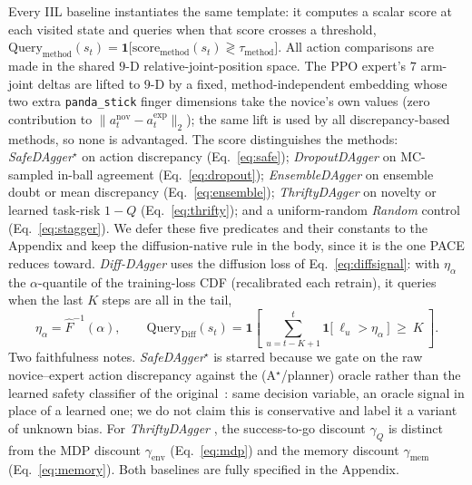 \documentclass[letterpaper]{article} %
\begin{document}
Every IIL baseline instantiates the same template: it computes a scalar score at
each visited state and queries when that score crosses a threshold,
$\mathrm{Query}_{\mathrm{method}}(s_t)=\mathbf{1}\big[\mathrm{score}_{\mathrm{method}}(s_t)\gtrless\tau_{\mathrm{method}}\big]$.
All action comparisons are made in the shared $9$-D relative-joint-position space. The
PPO expert's $7$ arm-joint deltas are lifted to $9$-D by a fixed, method-independent
embedding whose two extra \texttt{panda\_stick} finger dimensions take the novice's
own values (zero contribution to $\|a^{\mathrm{nov}}_t-a^{\mathrm{exp}}_t\|_2$); the
same lift is used by all discrepancy-based methods, so none is advantaged. The score
distinguishes the methods: \emph{SafeDAgger}$^\star$ on action discrepancy
(Eq.~\ref{eq:safe}); \emph{DropoutDAgger} on MC-sampled in-ball agreement
(Eq.~\ref{eq:dropout}); \emph{EnsembleDAgger} on ensemble doubt or mean discrepancy
(Eq.~\ref{eq:ensemble}); \emph{ThriftyDAgger} on novelty or learned task-risk $1-Q$
(Eq.~\ref{eq:thrifty}); and a uniform-random \emph{Random} control
(Eq.~\ref{eq:stagger}). We defer these five predicates and their constants to the
Appendix and keep the diffusion-native rule in the body, since it is the one PACE
reduces toward. \emph{Diff-DAgger} \cite{lee2025diffdagger} uses the diffusion loss
of Eq.~\ref{eq:diffsignal}: with $\eta_\alpha$ the $\alpha$-quantile of the
training-loss CDF (recalibrated each retrain), it queries when the last $K$ steps are
all in the tail,
\begin{equation}
\eta_\alpha=\hat F^{-1}(\alpha),
\qquad
\mathrm{Query}_{\mathrm{Diff}}(s_t)=\mathbf{1}\!\left[\ \sum_{u=t-K+1}^{t}\mathbf{1}\big[\ \ell_u>\eta_\alpha\ \big]\ \ge\ K\ \right].
\label{eq:diffdagger}
\end{equation}
Two faithfulness notes. \emph{SafeDAgger}$^\star$ is starred because we gate on the
raw novice--expert action discrepancy against the (A$^\star$/planner) oracle rather
than the learned safety classifier of the original~\cite{zhang2017safedagger}: same
decision variable, an oracle signal in place of a learned one; we do not claim this
is conservative and label it a variant of unknown bias. For \emph{ThriftyDAgger}
\cite{hoque2021thriftydagger}, the success-to-go discount $\gamma_Q$ is distinct from
the MDP discount $\gamma_{\mathrm{env}}$ (Eq.~\ref{eq:mdp}) and the memory discount
$\gamma_{\mathrm{mem}}$ (Eq.~\ref{eq:memory}). Both baselines are fully specified in
the Appendix.
\end{document}
